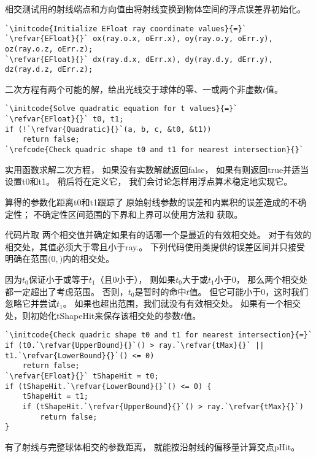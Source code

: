 相交测试用的射线端点和方向值由将射线变换到物体空间的浮点误差界初始化。
\begin{lstlisting}
`\initcode{Initialize EFloat ray coordinate values}{=}`
`\refvar{EFloat}{}` ox(ray.o.x, oErr.x), oy(ray.o.y, oErr.y), oz(ray.o.z, oErr.z);
`\refvar{EFloat}{}` dx(ray.d.x, dErr.x), dy(ray.d.y, dErr.y), dz(ray.d.z, dErr.z);
\end{lstlisting}

二次方程有两个可能的解，给出光线交于球体的零、一或两个非虚数$t$值。
\begin{lstlisting}
`\initcode{Solve quadratic equation for t values}{=}`
`\refvar{EFloat}{}` t0, t1;
if (!`\refvar{Quadratic}{}`(a, b, c, &t0, &t1))
    return false;
`\refcode{Check quadric shape t0 and t1 for nearest intersection}{}`
\end{lstlisting}

实用函数求解二次方程，
如果没有实数解就返回{\ttfamily false}，
如果有则返回{\ttfamily true}并适当设置{\ttfamily t0}和{\ttfamily t1}。
稍后将在定义它，
我们会讨论怎样用浮点算术稳定地实现它。

算得的参数化距离{\ttfamily t0}和{\ttfamily t1}跟踪了
原始射线参数的误差和内累积的误差造成的不确定性；
不确定性区间范围的下界和上界可以使用方法和
获取。

代码片取
两个相交值并确定如果有的话哪一个是最近的有效相交处。
对于有效的相交处，其值必须大于零且小于{\ttfamily ray.}。
下列代码使用类提供的误差区间并只接受
明确在范围$(0,$$)$内的相交处。

因为$t_0$保证小于或等于$t_1$（且$0$小于），
则如果$t_0$大于或$t_1$小于$0$，
那么两个相交处都一定超出了考虑范围。
否则，$t_0$是暂时的命中$t$值。
但它可能小于$0$，这时我们忽略它并尝试$t_1$。
如果也超出范围，我们就没有有效相交处。
如果有一个相交处，则初始化{\ttfamily tShapeHit}来保存该相交处的参数$t$值。
\begin{lstlisting}
`\initcode{Check quadric shape t0 and t1 for nearest intersection}{=}`
if (t0.`\refvar{UpperBound}{}`() > ray.`\refvar{tMax}{}` || t1.`\refvar{LowerBound}{}`() <= 0)
    return false;
`\refvar{EFloat}{}` tShapeHit = t0;
if (tShapeHit.`\refvar{LowerBound}{}`() <= 0) {
    tShapeHit = t1;
    if (tShapeHit.`\refvar{UpperBound}{}`() > ray.`\refvar{tMax}{}`)
        return false;
}
\end{lstlisting}
有了射线与完整球体相交的参数距离，
就能按沿射线的偏移量计算交点{\ttfamily pHit}。

